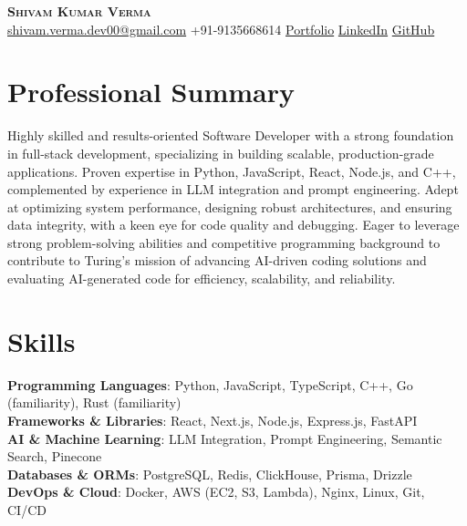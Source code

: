 \documentclass[letterpaper,10pt]{article}
\begin{document}
\begin{center}
  \textbf{\Huge \scshape Shivam Kumar Verma} \\ \vspace{4pt}
  \small \href{mailto:shivam.verma.dev00@gmail.com}{shivam.verma.dev00@gmail.com} \textbullet{} +91-9135668614 \textbullet{} \href{Portfolio}{Portfolio} \textbullet{} \href{LinkedIn}{LinkedIn} \textbullet{} \href{GitHub}{GitHub}
\end{center}

\section{Professional Summary}
\vspace{3pt}
\small{Highly skilled and results-oriented Software Developer with a strong foundation in full-stack development, specializing in building scalable, production-grade applications. Proven expertise in Python, JavaScript, React, Node.js, and C++, complemented by experience in LLM integration and prompt engineering. Adept at optimizing system performance, designing robust architectures, and ensuring data integrity, with a keen eye for code quality and debugging. Eager to leverage strong problem-solving abilities and competitive programming background to contribute to Turing's mission of advancing AI-driven coding solutions and evaluating AI-generated code for efficiency, scalability, and reliability.}

\section{Skills}
\begin{itemize}[leftmargin=0.15in, label={}]
  \small{\item{
    \textbf{Programming Languages}{: Python, JavaScript, TypeScript, C++, Go (familiarity), Rust (familiarity)} \\ \vspace{2pt}
    \textbf{Frameworks \& Libraries}{: React, Next.js, Node.js, Express.js, FastAPI} \\ \vspace{2pt}
    \textbf{AI \& Machine Learning}{: LLM Integration, Prompt Engineering, Semantic Search, Pinecone} \\ \vspace{2pt}
    \textbf{Databases \& ORMs}{: PostgreSQL, Redis, ClickHouse, Prisma, Drizzle} \\ \vspace{2pt}
    \textbf{DevOps \& Cloud}{: Docker, AWS (EC2, S3, Lambda), Nginx, Linux, Git, CI/CD}
  }}
\end{itemize}
\end{document}
